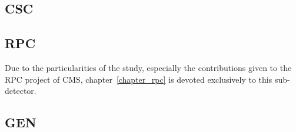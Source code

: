 
\subsection{CSC}

\subsection{RPC}

Due to the particularities of the study, especially the contributions given to the RPC project of CMS, chapter~\ref{chapter_rpc} is devoted exclusively to this sub-detector.

\subsection{GEN}
